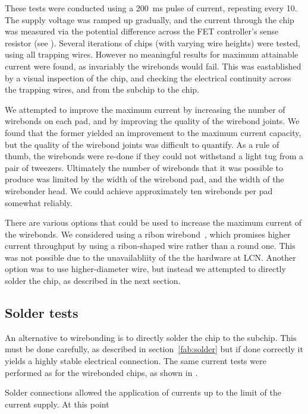 These tests were conducted using a \SI{200}{\milli\second} pulse of current,
repeating every \SI{10}{\seconds}. The supply voltage was ramped up gradually,
and the current through the chip was measured via the potential difference
across the FET controller's sense resistor (see ).
Several iterations of chips (with varying wire heights) were tested, using all
trapping wires. However no meaningful results for maximum attainable current
were found, as invariably the wirebonds would fail. This was eastablished by a
visual inspection of the chip, and checking the electrical continuity across
the trapping wires, and from the subchip to the chip.

We attempted to improve the maximum current by increasing the number of
wirebonds on each pad, and by improving the quality of the wirebond joints. We
found that the former yielded an improvement to the maximum current capacity,
but the quality of the wirebond joints was difficult to quantify. As a rule of
thumb, the wirebonds were re-done if they could not withstand a light tug from
a pair of tweezers. Ultimately the number of wirebonds that it was possible to
produce was limited by the width of the wirebond pad, and the width of the
wirebonder head. We could achieve approximately ten wirebonds per pad somewhat
reliably.

There are various options that could be used to increase the maximum current of
the wirebonds.  We considered using a ribon wirebond~\cite{}, which promises
higher current throughput by using a ribon-shaped wire rather than a round one.
This was not possible due to the unavailabliity of the the hardware at LCN.
Another option was to use higher-diameter wire, but instead we attempted to
directly solder the chip, as described in the next section.

\subsection{Solder tests}

An alternative to wirebonding is to directly solder the chip to the subchip.
This must be done carefully, as described in section~\ref{fab:solder} but
if done correctly it yields a highly stable electrical connection.  The same current tests were performed as for the 
wirebonded chips, as shown in .

Solder connections allowed the application of currents up to the limit of the
current supply. At this point 


